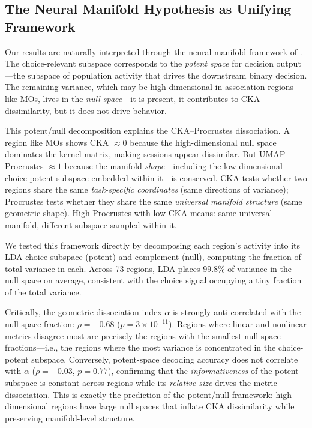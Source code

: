 \documentclass{article}
\begin{document}
\subsection{The Neural Manifold Hypothesis as Unifying Framework}

Our results are naturally interpreted through the neural manifold framework of \citet{gallego2017neural}. The choice-relevant subspace corresponds to the \emph{potent space} for decision output \citep{kaufman2014cortical}---the subspace of population activity that drives the downstream binary decision. The remaining variance, which may be high-dimensional in association regions like MOs, lives in the \emph{null space}---it is present, it contributes to CKA dissimilarity, but it does not drive behavior.

This potent/null decomposition explains the CKA--Procrustes dissociation. A region like MOs shows CKA $\approx 0$ because the high-dimensional null space dominates the kernel matrix, making sessions appear dissimilar. But UMAP Procrustes $\approx 1$ because the manifold \emph{shape}---including the low-dimensional choice-potent subspace embedded within it---is conserved. CKA tests whether two regions share the same \emph{task-specific coordinates} (same directions of variance); Procrustes tests whether they share the same \emph{universal manifold structure} (same geometric shape). High Procrustes with low CKA means: same universal manifold, different subspace sampled within it.

We tested this framework directly by decomposing each region's activity into its LDA choice subspace (potent) and complement (null), computing the fraction of total variance in each. Across 73 regions, LDA places 99.8\% of variance in the null space on average, consistent with the choice signal occupying a tiny fraction of the total variance.

Critically, the geometric dissociation index $\alpha$ is strongly anti-correlated with the null-space fraction: $\rho = -0.68$ ($p = 3 \times 10^{-11}$). Regions where linear and nonlinear metrics disagree most are precisely the regions with the smallest null-space fractions---i.e., the regions where the most variance is concentrated in the choice-potent subspace. Conversely, potent-space decoding accuracy does not correlate with $\alpha$ ($\rho = -0.03$, $p = 0.77$), confirming that the \emph{informativeness} of the potent subspace is constant across regions while its \emph{relative size} drives the metric dissociation. This is exactly the prediction of the potent/null framework: high-dimensional regions have large null spaces that inflate CKA dissimilarity while preserving manifold-level structure.
\end{document}
